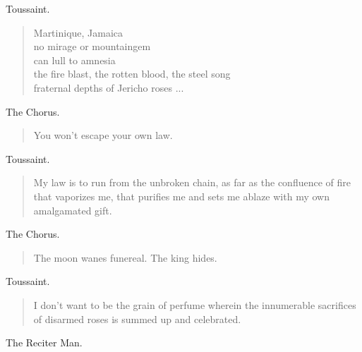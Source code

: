 \documentclass[letterpaper,article,12pt,oneside,notitlepage]{memoir}
\begin{document}
\begin{center}Toussaint.\end{center}

\begin{verse}
Martinique, Jamaica \\
no mirage or mountaingem \\
can lull to amnesia \\
the fire blast, the rotten blood, the steel song \\
fraternal depths of Jericho roses  ... \\
\end{verse}

\begin{center}The Chorus.\end{center}

\begin{verse}
\hspace{1cm} You won't escape your own law. \\
\end{verse}

\begin{center}Toussaint.\end{center}

\begin{verse}
\indent My law is to run from the unbroken chain, as far as the confluence of fire that vaporizes me, that purifies me and sets me ablaze with my own amalgamated gift. \\
\end{verse}

\begin{center}The Chorus.\end{center}

\begin{verse}
The moon wanes funereal. The king hides. \\
\end{verse}

\begin{center}Toussaint.\end{center}

\begin{verse}
\indent I don't want to be the grain of perfume wherein the innumerable sacrifices of disarmed roses is summed up and celebrated. \\
\end{verse}

\clearpage

\begin{center}The Reciter Man.\end{center}
\end{document}
